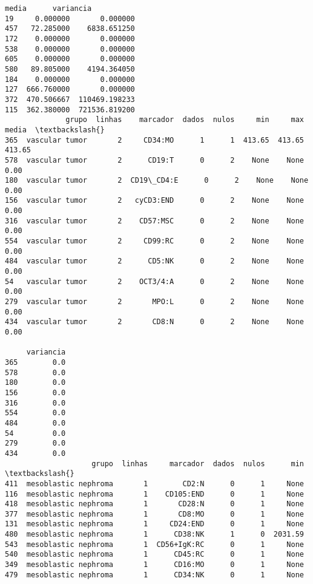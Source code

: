 \documentclass[11pt]{article}
\begin{document}
\begin{Verbatim}[commandchars=\\\{\}]
          media      variancia  
19     0.000000       0.000000  
457   72.285000    6838.651250  
172    0.000000       0.000000  
538    0.000000       0.000000  
605    0.000000       0.000000  
580   89.805000    4194.364050  
184    0.000000       0.000000  
127  666.760000       0.000000  
372  470.506667  110469.198233  
115  362.380000  721536.819200  
              grupo  linhas    marcador  dados  nulos     min     max   media  \textbackslash{}
365  vascular tumor       2     CD34:MO      1      1  413.65  413.65  413.65   
578  vascular tumor       2      CD19:T      0      2    None    None    0.00   
180  vascular tumor       2  CD19\_CD4:E      0      2    None    None    0.00   
156  vascular tumor       2   cyCD3:END      0      2    None    None    0.00   
316  vascular tumor       2    CD57:MSC      0      2    None    None    0.00   
554  vascular tumor       2     CD99:RC      0      2    None    None    0.00   
484  vascular tumor       2      CD5:NK      0      2    None    None    0.00   
54   vascular tumor       2    OCT3/4:A      0      2    None    None    0.00   
279  vascular tumor       2       MPO:L      0      2    None    None    0.00   
434  vascular tumor       2       CD8:N      0      2    None    None    0.00   

     variancia  
365        0.0  
578        0.0  
180        0.0  
156        0.0  
316        0.0  
554        0.0  
484        0.0  
54         0.0  
279        0.0  
434        0.0  
                    grupo  linhas     marcador  dados  nulos      min  \textbackslash{}
411  mesoblastic nephroma       1        CD2:N      0      1     None   
116  mesoblastic nephroma       1    CD105:END      0      1     None   
418  mesoblastic nephroma       1       CD28:N      0      1     None   
377  mesoblastic nephroma       1       CD8:MO      0      1     None   
131  mesoblastic nephroma       1     CD24:END      0      1     None   
480  mesoblastic nephroma       1      CD38:NK      1      0  2031.59   
543  mesoblastic nephroma       1  CD56+IgK:RC      0      1     None   
540  mesoblastic nephroma       1      CD45:RC      0      1     None   
349  mesoblastic nephroma       1      CD16:MO      0      1     None   
479  mesoblastic nephroma       1      CD34:NK      0      1     None   


\end{Verbatim}
\end{document}

